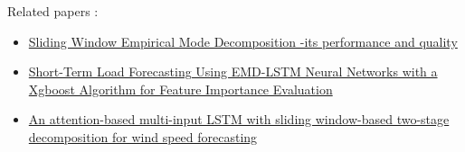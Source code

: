\documentclass[letterpaper,11pt]{article}
\begin{document}
\vfill
Related papers :
\begin{itemize}
  \item \href{https://epjnonlinearbiomedphys.springeropen.com/articles/10.1140/epjnbp/s40366-014-0014-9}{Sliding Window Empirical Mode
  Decomposition -its performance and quality}
  \item \href{https://www.mdpi.com/1996-1073/10/8/1168}{Short-Term Load Forecasting Using EMD-LSTM Neural Networks with a Xgboost Algorithm for
  Feature Importance Evaluation}
  \item \href{https://pdf.sciencedirectassets.com/271429/1-s2.0-S0306261924X00185/1-s2.0-S0306261924014405/main.pdf?X-Amz-Security-Token=IQoJb3JpZ2luX2VjEGwaCXVzLWVhc3QtMSJHMEUCIFoWqAhbiinl3ix6AR1mW3B5OcqVELeCM%2BvoGz0MmZW7AiEAmtvTdh2uINhXrEN%2BqF0wBYA%2Bx9ZCdChnl57cjz%2FGGJ4qvAUI9P%2F%2F%2F%2F%2F%2F%2F%2F%2F%2FARAFGgwwNTkwMDM1NDY4NjUiDCatv51EsGNidT4vliqQBUSLAip2qgeU1wJI2NGmfJiBQ5zsCBjRD9G01%2B68Cxo3RDBiXA1LbdqT%2FMoA5EE%2Fk7dhrHLx0X1WO%2FsP2iUC7VadvgjRxJYlSAIt4qjui4k1s2vrSsv%2BIXkfFeNWSa0DPXs3exM6dJl43885vAW7%2FLTusAthmRAfdG3YuqJh9XxKq12xbrSePgAVCDX4OLNOEamtmNGdVKljJZYsCeO%2Bc87cq16UNyQDU3LQhfrcgPbuVhScdQq12WWHhlRETApEdg%2F7Tu5%2BquikxuixIavnj%2FCINDBQcpm8qE%2FSdgtA5T4yBsRrUbqjGAUWaVHXVnYqZVErq6jI1zWLYrpRqaL6V1O7gD0IcJ1MyEEXyV9fXe0M206RvFt257nbGVsySLbdCLlBUnKIGEEegCwbveiEDxwd8SK3cU7J%2Bqo6aeKd9zzsyI29YUF4Tf2iph7X3y0D3P4Gxgr3BR7OE3Q5i9nR3PDiFVAosqhk9mYwBpIw8ISAUih%2FFOsPB2bRhkiX23Vg8KXYgtuQ3qLWqNOAyMTPTlxz8WfwDbP0Brku2A%2Bq2iDhe8z3C%2BxfCOi%2FMw9YLR%2BTnGANdW0Q%2BuPDHJw61Ps3cRDvbPYjHWJH2n0tm6uu1si8QV6Pk%2FfrKNOsLCS93y%2FVyUmDCWoBQE1nogPtflYnzTHFYutVJKwCUJcEJ7AgJLY9Dc4rRu7BAxwDtGnWPBxrD7JddmL6Mj%2B1pRJxAmwGXxruc4W6ddS8N5fK7%2FVlNjbTPD%2F1BlIbeYn6KEx%2BfcAWMQtmgZqqJ7NfrMGiH%2B0nvK1qx7imCpF58G8Le86559kLHWmMTbWT5DIGF0p0968MQkxNoy2F65in75eFeSIDVhthkJ%2B0tMVfQTHLClI4gqFFML37pMAGOrEB4sLhJQY7WAhiqluDhgDpk7Mp0Rp6pq6xhpDqYoq9kXjOjDOpAPiVyJe%2FHLIs9g0qtCSfILnPYNWUK%2FOWjSL7e%2BWIBZ83v9hW0drnFW2MNNaoINarusPXKyw1LJlujqckKlqcuTrj9X9hhoHlH%2F4vjOtpjd19wdxKMiIY08Z%2F8o1tZstuMbFKOm%2FI6jL2KOZXHSeHOKpdN0L6U3DKqDVYOUgGP94xCUmR6VtGwou3JMB3&X-Amz-Algorithm=AWS4-HMAC-SHA256&X-Amz-Date=20250423T195138Z&X-Amz-SignedHeaders=host&X-Amz-Expires=299&X-Amz-Credential=ASIAQ3PHCVTYYJXNQUA7%2F20250423%2Fus-east-1%2Fs3%2Faws4_request&X-Amz-Signature=171ce7e9ef2a61c822ab5e836113a04ac881d24638bfcafecc422ebef0b35a65&hash=2de7ac10a381a46f6e2ea4319ed1f57aa7d11df62c61029e5a3f907fa2db6fa0&host=68042c943591013ac2b2430a89b270f6af2c76d8dfd086a07176afe7c76c2c61&pii=S0306261924014405&tid=spdf-51a7ca99-a11b-47ef-9468-cac492f2964d&sid=85df26183780b241fd383b000bed50d4cd65gxrqa&type=client&tsoh=d3d3LnNjaWVuY2VkaXJlY3QuY29t&rh=d3d3LnNjaWVuY2VkaXJlY3QuY29t&ua=11105f575606005558&rr=934fe58fb82afa06&cc=us}{An attention-based multi-input LSTM with sliding window-based two-stage
decomposition for wind speed forecasting}
  
\end{itemize}
\end{document}

